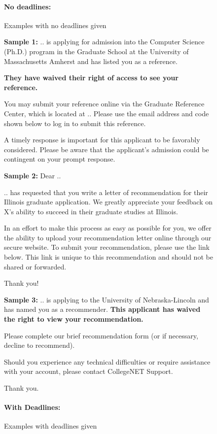 \documentclass[oneside,11pt]{book}
\newenvironment{examplebox}[1][]{
  \small
  \begin{marker}[\faChessBishop{}]
    {\textbf{#1}}
  }{
  \end{marker}
}
\begin{document}
\begin{figure}
\begin{examplebox}
    \footnotesize
    \paragraph{No deadlines:} Examples with no deadlines given
    

    \textbf{Sample 1:}
    .. is applying for admission into the Computer Science (Ph.D.) program in the Graduate School at the University of Massachusetts Amherst and has listed you as a reference.
    
    \textbf{They have waived their right of access to see your reference.}
    
    You may submit your reference online via the Graduate Reference Center, which is located at .. Please use the email address and code shown below to log in to submit this reference.
    
    A timely response is important for this applicant to be favorably considered. Please be aware that the applicant's admission could be contingent on your prompt response.
    
    \textbf{Sample 2:}
    Dear ..
    
    .. has requested that you write a letter of recommendation for their Illinois graduate application. We greatly appreciate your feedback on X's ability to succeed in their graduate studies at Illinois.
    
    In an effort to make this process as easy as possible for you, we offer the ability to upload your recommendation letter online through our secure website. To submit your recommendation, please use the link below. This link is unique to this recommendation and should not be shared or forwarded.
    
    Thank you!
    
    \textbf{Sample 3:}
    .. is applying to the University of Nebraska-Lincoln and has named you as a recommender. \textbf{This applicant has waived the right to view your recommendation.}
    
    Please complete our brief recommendation form (or if necessary, decline to recommend).
    
    Should you experience any technical difficulties or require assistance with your account, please contact CollegeNET Support.
    
    Thank you.
    
    \paragraph{With Deadlines:} Examples with deadlines given
    

\end{examplebox}
\end{figure}
\end{document}
